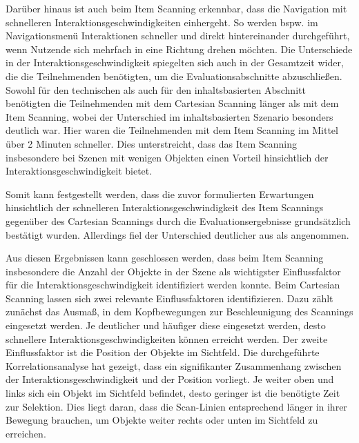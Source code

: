 Darüber hinaus ist auch beim Item Scanning erkennbar, dass die Navigation mit schnelleren Interaktionsgeschwindigkeiten einhergeht. So werden bspw. im Navigationsmenü Interaktionen schneller und direkt hintereinander durchgeführt, wenn Nutzende sich mehrfach in eine Richtung drehen möchten. 
Die Unterschiede in der Interaktionsgeschwindigkeit spiegelten sich auch in der Gesamtzeit wider, die die Teilnehmenden benötigten, um die Evaluationsabschnitte abzuschließen. Sowohl für den technischen als auch für den inhaltsbasierten Abschnitt benötigten die Teilnehmenden mit dem Cartesian Scanning länger als mit dem Item Scanning, wobei der Unterschied im inhaltsbasierten Szenario besonders deutlich war. Hier waren die Teilnehmenden mit dem Item Scanning im Mittel über 2 Minuten schneller. Dies unterstreicht, dass das Item Scanning insbesondere bei Szenen mit wenigen Objekten einen Vorteil hinsichtlich der Interaktionsgeschwindigkeit bietet.

Somit kann festgestellt werden, dass die zuvor formulierten Erwartungen hinsichtlich der schnelleren Interaktionsgeschwindigkeit des Item Scannings gegenüber des Cartesian Scannings durch die Evaluationsergebnisse grundsätzlich bestätigt wurden. Allerdings fiel der Unterschied deutlicher aus als angenommen. 

Aus diesen Ergebnissen kann geschlossen werden, dass beim Item Scanning insbesondere die Anzahl der Objekte in der Szene als wichtigster Einflussfaktor für die Interaktionsgeschwindigkeit identifiziert werden konnte. Beim Cartesian Scanning lassen sich zwei relevante Einflussfaktoren identifizieren. Dazu zählt zunächst das Ausmaß, in dem Kopfbewegungen zur Beschleunigung des Scannings eingesetzt werden. Je deutlicher und häufiger diese eingesetzt werden, desto schnellere Interaktionsgeschwindigkeiten können erreicht werden. Der zweite Einflussfaktor ist die Position der Objekte im Sichtfeld. Die durchgeführte Korrelationsanalyse hat gezeigt, dass ein signifikanter Zusammenhang zwischen der Interaktionsgeschwindigkeit und der Position vorliegt. Je weiter oben und links sich ein Objekt im Sichtfeld befindet, desto geringer ist die benötigte Zeit zur Selektion. Dies liegt daran, dass die Scan-Linien entsprechend länger in ihrer Bewegung brauchen, um Objekte weiter rechts oder unten im Sichtfeld zu erreichen. 


